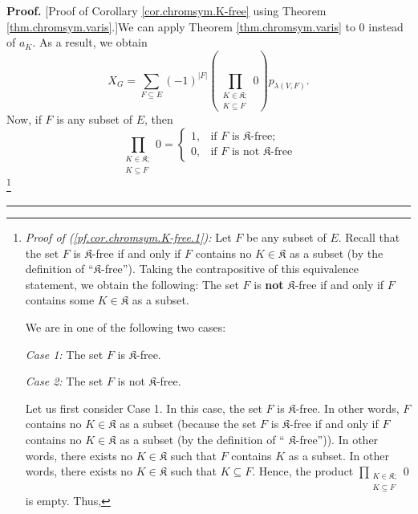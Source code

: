 \documentclass[numbers=enddot,12pt,final,onecolumn,notitlepage]{scrartcl}%
\theoremstyle{definition}
\newenvironment{proof}[1][Proof]{\noindent\textbf{#1.} }{\ \rule{0.5em}{0.5em}}
\newenvironment{verlong}{}{}
\let\sumnonlimits\sum
\let\prodnonlimits\prod
\renewcommand{\sum}{\sumnonlimits\limits}
\renewcommand{\prod}{\prodnonlimits\limits}
\begin{document}
\begin{verlong}
\begin{proof}
[Proof of Corollary \ref{cor.chromsym.K-free} using Theorem
\ref{thm.chromsym.varis}.]We can apply Theorem \ref{thm.chromsym.varis} to $0$
instead of $a_{K}$. As a result, we obtain%
\begin{equation}
X_{G}=\sum_{F\subseteq E}\left(  -1\right)  ^{\left\vert F\right\vert }\left(
\prod_{\substack{K\in\mathfrak{K};\\K\subseteq F}}0\right)  p_{\lambda\left(
V,F\right)  }. \label{pf.cor.chromsym.K-free.0}%
\end{equation}
Now, if $F$ is any subset of $E$, then%
\begin{equation}
\prod_{\substack{K\in\mathfrak{K};\\K\subseteq F}}0=%
\begin{cases}
1, & \text{if }F\text{ is }\mathfrak{K}\text{-free;}\\
0, & \text{if }F\text{ is not }\mathfrak{K}\text{-free}%
\end{cases}
\label{pf.cor.chromsym.K-free.1}%
\end{equation}
\footnote{\textit{Proof of (\ref{pf.cor.chromsym.K-free.1}):} Let $F$ be any
subset of $E$. Recall that the set $F$ is $\mathfrak{K}$-free if and only if
$F$ contains no $K\in\mathfrak{K}$ as a subset (by the definition of
\textquotedblleft$\mathfrak{K}$-free\textquotedblright). Taking the
contrapositive of this equivalence statement, we obtain the following: The set
$F$ is \textbf{not} $\mathfrak{K}$-free if and only if $F$ contains some
$K\in\mathfrak{K}$ as a subset.
\par
We are in one of the following two cases:
\par
\textit{Case 1:} The set $F$ is $\mathfrak{K}$-free.
\par
\textit{Case 2:} The set $F$ is not $\mathfrak{K}$-free.
\par
Let us first consider Case 1. In this case, the set $F$ is $\mathfrak{K}%
$-free. In other words, $F$ contains no $K\in\mathfrak{K}$ as a subset
(because the set $F$ is $\mathfrak{K}$-free if and only if $F$ contains no
$K\in\mathfrak{K}$ as a subset (by the definition of \textquotedblleft%
$\mathfrak{K}$-free\textquotedblright)). In other words, there exists no
$K\in\mathfrak{K}$ such that $F$ contains $K$ as a subset. In other words,
there exists no $K\in\mathfrak{K}$ such that $K\subseteq F$. Hence, the
product $\prod_{\substack{K\in\mathfrak{K};\\K\subseteq F}}0$ is empty. Thus,
}
\end{proof}
\end{verlong}
\end{document}
